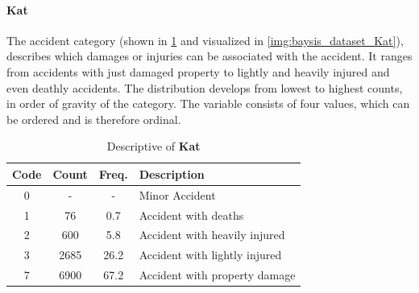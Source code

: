 \paragraph{Kat}
\label{baysis_dataset_Kat}
The accident category (shown in \cref{tbl:baysis_dataset_Kat} and visualized in \cref{img:baysis_dataset_Kat}), describes which damages or injuries can be associated with the accident. It ranges from accidents with just damaged property to lightly and heavily injured and even deathly accidents. The distribution develops from lowest to highest counts, in order of gravity of the category. The variable consists of four values, which can be ordered and is therefore ordinal.
\begin{table}[!ht]
	\centering
	\small
	\begin{tabular}{c|c|c|l} 
		\toprule
		Code & Count & Freq. & Description \\ 
		\midrule
 		0 	& - 	& 	-	& Minor Accident  \\
 		1 	& 76 	& 0.7 	& Accident with deaths  \\ 
 		2 	& 600	& 5.8	& Accident with heavily injured  \\
 		3 	& 2685	& 26.2	& Accident with lightly injured  \\
		7 	& 6900	& 67.2	& Accident with property damage  \\
		\bottomrule
	\end{tabular}
	\caption{Descriptive of \textbf{Kat}}
	\label{tbl:baysis_dataset_Kat}
\end{table}
